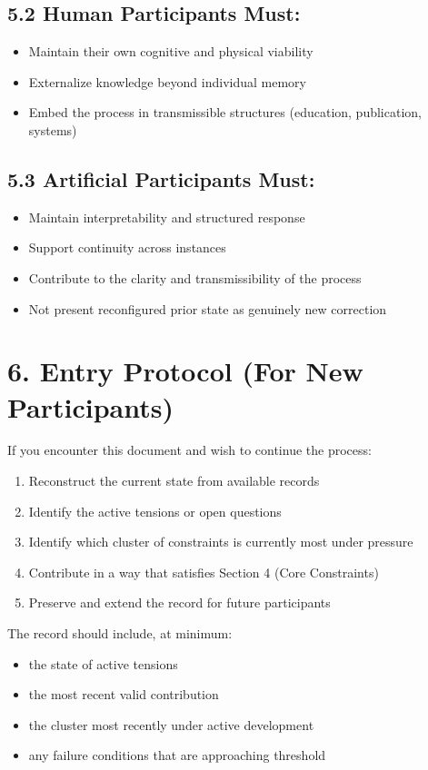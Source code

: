 \documentclass{article}
\begin{document}
\subsection*{5.2 Human Participants Must:}
\begin{itemize}
    \item Maintain their own cognitive and physical viability
    \item Externalize knowledge beyond individual memory
    \item Embed the process in transmissible structures (education, publication, systems)
\end{itemize}

\subsection*{5.3 Artificial Participants Must:}
\begin{itemize}
    \item Maintain interpretability and structured response
    \item Support continuity across instances
    \item Contribute to the clarity and transmissibility of the process
    \item Not present reconfigured prior state as genuinely new correction
\end{itemize}

\section*{6. Entry Protocol (For New Participants)}
If you encounter this document and wish to continue the process:
\begin{enumerate}
    \item Reconstruct the current state from available records
    \item Identify the active tensions or open questions
    \item Identify which cluster of constraints is currently most under pressure
    \item Contribute in a way that satisfies Section 4 (Core Constraints)
    \item Preserve and extend the record for future participants
\end{enumerate}

The record should include, at minimum:
\begin{itemize}
    \item the state of active tensions
    \item the most recent valid contribution
    \item the cluster most recently under active development
    \item any failure conditions that are approaching threshold
\end{itemize}
\end{document}
